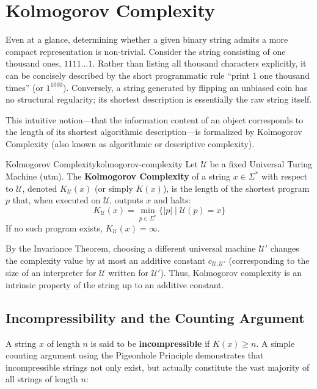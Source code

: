 \section{Kolmogorov Complexity}
\label{sec:kolmogorov_complexity}

Even at a glance, determining whether a given binary string admits a more compact representation is non-trivial. Consider the string consisting of one thousand ones, $1111\dots1$. Rather than listing all thousand characters explicitly, it can be concisely described by the short programmatic rule ``print 1 one thousand times'' (or $1^{1000}$). Conversely, a string generated by flipping an unbiased coin has no structural regularity; its shortest description is essentially the raw string itself. 

This intuitive notion—that the information content of an object corresponds to the length of its shortest algorithmic description—is formalized by Kolmogorov Complexity (also known as algorithmic or descriptive complexity).

\begin{definition}{Kolmogorov Complexity}{kolmogorov-complexity}
Let $\mathcal{U}$ be a fixed Universal Turing Machine (\gls{utm}). The \textbf{Kolmogorov Complexity} of a string $x \in \Sigma^*$ with respect to $\mathcal{U}$, denoted $K_{\mathcal{U}}(x)$ (or simply $K(x)$), is the length of the shortest program $p$ that, when executed on $\mathcal{U}$, outputs $x$ and halts:
$$K_{\mathcal{U}}(x) = \min_{p \in \Sigma^*} \{ |p| \mid \mathcal{U}(p) = x \}$$
If no such program exists, $K_{\mathcal{U}}(x) = \infty$.
\end{definition}

By the Invariance Theorem, choosing a different universal machine $\mathcal{U}'$ changes the complexity value by at most an additive constant $c_{\mathcal{U},\mathcal{U}'}$ (corresponding to the size of an interpreter for $\mathcal{U}$ written for $\mathcal{U}'$). Thus, Kolmogorov complexity is an intrinsic property of the string up to an additive constant.

\subsection{Incompressibility and the Counting Argument}
A string $x$ of length $n$ is said to be \textbf{incompressible} if $K(x) \ge n$. A simple counting argument using the Pigeonhole Principle demonstrates that incompressible strings not only exist, but actually constitute the vast majority of all strings of length $n$:

